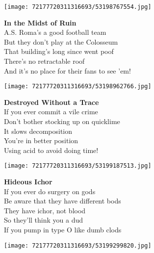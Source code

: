 \documentclass[10pt,letterpaper]{article}
\begin{document}
\begin{center}\texttt{[image: 72177720311316693/53198767554.jpg]}
\end{center}
\begin{center}
\textbf{In the Midst of Ruin}\\
\vskip 0.2in
A.S. Roma's a good football team\\
But they don't play at the Colosseum\\
That building's long since went poof\\
There's no retractable roof\\
And it's no place for their fans to see 'em!\\
\end{center}
\pagebreak

\begin{center}\texttt{[image: 72177720311316693/53198962766.jpg]}
\end{center}
\begin{center}
\textbf{Destroyed Without a Trace}\\
\vskip 0.2in
If you ever commit a vile crime\\
Don't bother stocking up on quicklime\\
It slows decomposition\\
You're in better position\\
Using acid to avoid doing time!\\
\end{center}
\pagebreak

\begin{center}
\texttt{[image: 72177720311316693/53199187513.jpg]}
\end{center}

\begin{center}
\textbf{Hideous Ichor}\\
\vskip 0.2in
If you ever do surgery on gods\\
Be aware that they have different bods\\
They have ichor, not blood\\
So they'll think you a dud\\
If you pump in type O like dumb clods\\
\end{center}
\pagebreak

\begin{center}
\texttt{[image: 72177720311316693/53199299820.jpg]}
\end{center}
\end{document}
